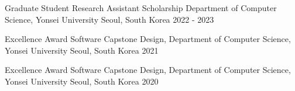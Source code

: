 


\begin{cvhonors}

  \cvhonor
    {Graduate Student Research Assistant Scholarship} %
    {Department of Computer Science, Yonsei University} %
    {Seoul, South Korea} %
    {2022 - 2023} %

  \cvhonor
    {Excellence Award} %
    {Software Capstone Design, Department of Computer Science, Yonsei University} %
    {Seoul, South Korea} %
    {2021} %

  \cvhonor
    {Excellence Award} %
    {Software Capstone Design, Department of Computer Science, Yonsei University} %
    {Seoul, South Korea} %
    {2020} %

\end{cvhonors}
